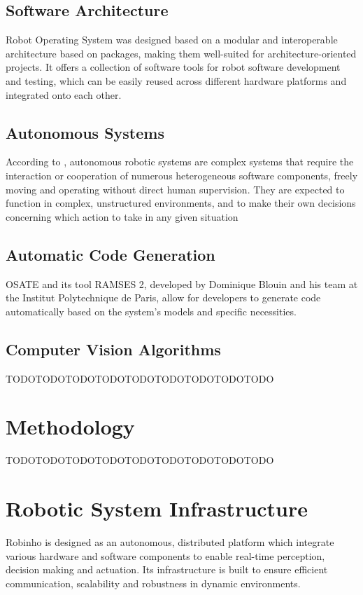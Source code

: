 \documentclass[
    12pt, 
    a4paper, 
    chapter=TITLE,		%
    section=TITLE,		%
    oneside,            %
    english
]{abntex2}
\begin{document}
\section{Software Architecture}
\cite{Bernardo2025, ROSWebsite} Robot Operating System was designed based on a modular and interoperable architecture based on packages, making them well-suited for architecture-oriented projects. It offers a collection of software tools for robot software development and testing, which can be easily reused across different hardware platforms and integrated onto each other.

\section{Autonomous Systems}
According to \cite{Wahde2016, Bensalem2009}, autonomous robotic systems are complex systems that require the interaction or cooperation of numerous heterogeneous software components, freely moving and operating without direct human supervision. They are expected to function in complex, unstructured environments, and to make their own decisions concerning which action to take in any given situation

\section{Automatic Code Generation}
OSATE and its tool RAMSES 2, developed by Dominique Blouin and his team at the Institut Polytechnique de Paris, allow for developers to generate code automatically based on the system's models and specific necessities.

\section{Computer Vision Algorithms}
TODOTODOTODOTODOTODOTODOTODOTODOTODO

\chapter{Methodology}
TODOTODOTODOTODOTODOTODOTODOTODOTODO

\chapter{Robotic System Infrastructure}
Robinho is designed as an autonomous, distributed platform which integrate various hardware and software components to enable real-time perception, decision making and actuation. Its infrastructure is built to ensure efficient communication, scalability and robustness in dynamic environments.
\end{document}
